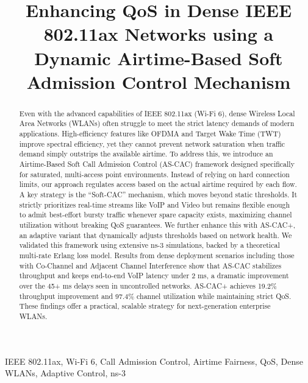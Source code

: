 \documentclass[conference]{IEEEtran}
\begin{document}
\title{Enhancing QoS in Dense IEEE 802.11ax Networks using a Dynamic Airtime-Based Soft Admission Control Mechanism}

\author{
}

\maketitle

\begin{abstract}
Even with the advanced capabilities of IEEE 802.11ax (Wi-Fi 6), dense Wireless Local Area Networks (WLANs) often struggle to meet the strict latency demands of modern applications. High-efficiency features like OFDMA and Target Wake Time (TWT) improve spectral efficiency, yet they cannot prevent network saturation when traffic demand simply outstrips the available airtime. To address this, we introduce an Airtime-Based Soft Call Admission Control (AS-CAC) framework designed specifically for saturated, multi-access point environments. Instead of relying on hard connection limits, our approach regulates access based on the actual airtime required by each flow. A key strategy is the ``Soft-CAC'' mechanism, which moves beyond static thresholds. It strictly prioritizes real-time streams like VoIP and Video but remains flexible enough to admit best-effort bursty traffic whenever spare capacity exists, maximizing channel utilization without breaking QoS guarantees. We further enhance this with AS-CAC+, an adaptive variant that dynamically adjusts thresholds based on network health. We validated this framework using extensive ns-3 simulations, backed by a theoretical multi-rate Erlang loss model. Results from dense deployment scenarios including those with Co-Channel and Adjacent Channel Interference show that AS-CAC stabilizes throughput and keeps end-to-end VoIP latency under 2 ms, a dramatic improvement over the 45+ ms delays seen in uncontrolled networks. AS-CAC+ achieves 19.2\% throughput improvement and 97.4\% channel utilization while maintaining strict QoS. These findings offer a practical, scalable strategy for next-generation enterprise WLANs.
\end{abstract}
\begin{IEEEkeywords}
IEEE 802.11ax, Wi-Fi 6, Call Admission Control, Airtime Fairness, QoS, Dense WLANs, Adaptive Control, ns-3
\end{IEEEkeywords}
\end{document}
